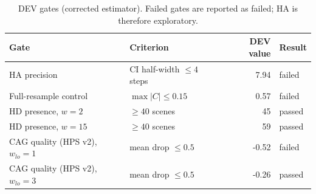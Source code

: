 \begin{table}[t]\centering\small
\caption{DEV gates (corrected estimator). Failed gates are reported as failed; HA is therefore exploratory.}\label{tab:dev-gates}
\begin{tabular}{llrl}
\toprule
Gate & Criterion & DEV value & Result \\
\midrule
HA precision & CI half-width $\le 4$ steps & 7.94 & failed \\
Full-resample control & $\max|C| \le 0.15$ & 0.57 & failed \\
HD presence, $w=2$ & $\ge 40$ scenes & 45 & passed \\
HD presence, $w=15$ & $\ge 40$ scenes & 59 & passed \\
CAG quality (HPS v2), $w_{lo}=1$ & mean drop $\le 0.5$ & -0.52 & failed \\
CAG quality (HPS v2), $w_{lo}=3$ & mean drop $\le 0.5$ & -0.26 & passed \\
\bottomrule
\end{tabular}
\end{table}
